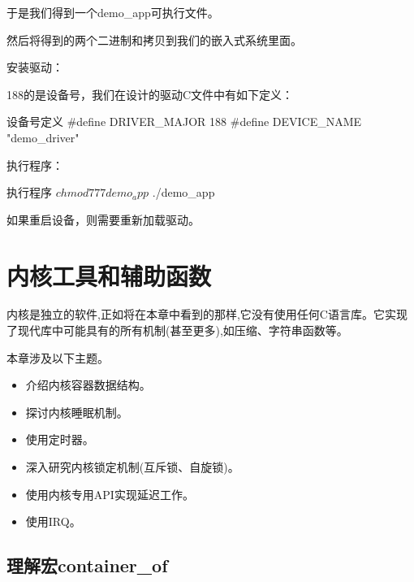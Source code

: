 \documentclass[lang=cn,newtx,10pt,scheme=chinese]{elegantbook}
\begin{document}
于是我们得到一个demo\_app可执行文件。

然后将得到的两个二进制和拷贝到我们的嵌入式系统里面。

安装驱动：


188的是设备号，我们在设计的驱动C文件中有如下定义：

\begin{mycode}{设备号定义}
#define    DRIVER_MAJOR     188
#define    DEVICE_NAME      "demo_driver"
\end{mycode}

执行程序：

\begin{mycode}{执行程序}
$ chmod 777 demo_app
$ ./demo_app
\end{mycode}

\begin{marker}
    如果重启设备，则需要重新加载驱动。
\end{marker}

\chapter{内核工具和辅助函数}

内核是独立的软件,正如将在本章中看到的那样,它没有使用任何C语言库。它实现了现代库中可能具有的所有机制(甚至更多),如压缩、字符串函数等。

本章涉及以下主题。

\begin{itemize}
    \item 介绍内核容器数据结构。
    \item 探讨内核睡眠机制。
    \item 使用定时器。
    \item 深入研究内核锁定机制(互斥锁、自旋锁)。
    \item 使用内核专用API实现延迟工作。
    \item 使用IRQ。
\end{itemize}

\section{理解宏container\_of}
\end{document}

